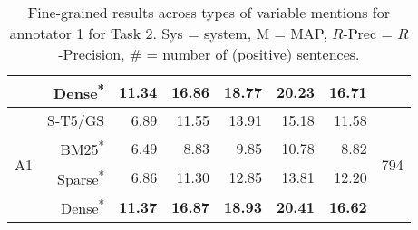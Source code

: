 \documentclass[11pt]{article}
\begin{document}
\begin{table*}[]
\begin{tabular}{l|r|r|r|r|r|r|c}
      &    Dense\textsuperscript{*} &  \textbf{11.34} &  \textbf{16.86} &   \textbf{18.77} &   \textbf{20.23} &        \textbf{16.71} &         \\
    \hline
    \hline
       \multirow{4}{2em}{A1} &    S-T5/GS &   6.89 &  11.55 &   13.91 &   15.18 &        11.58 &      \multirow{4}{2em}{794} \\
        &    BM25\textsuperscript{*} &   6.49 &   8.83 &    9.85 &   10.78 &         8.82 &       \\
        &    Sparse\textsuperscript{*} &   6.86 &  11.30 &   12.85 &   13.81 &        12.20 &       \\
        &    Dense\textsuperscript{*} &  \textbf{11.37} &  \textbf{16.87} &   \textbf{18.93} &   \textbf{20.41} &        \textbf{16.62} &       \\
    \hline
    \end{tabular}
    \caption{Fine-grained results across types of variable mentions for annotator 1 for Task 2. Sys = system, M = MAP, $R$-Prec = $R$-Precision, \# = number of (positive) sentences.}
    \label{tab:T2-Ann1}
\end{table*}
\end{document}
